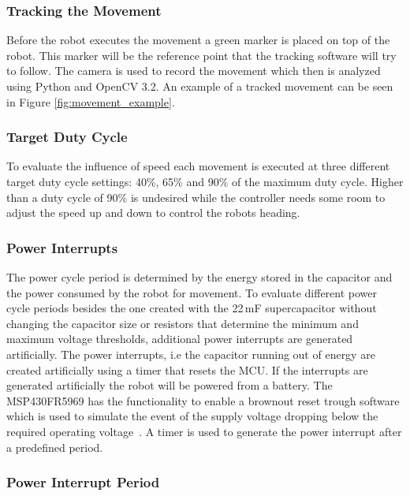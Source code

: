 \subsubsection{Tracking the Movement}

Before the robot executes the movement a green marker is placed on top of the robot.
This marker will be the reference point that the tracking software will try to follow.
The camera is used to record the movement which then is analyzed using Python and OpenCV 3.2.
An example of a tracked movement can be seen in Figure \ref{fig:movement_example}.

\subsubsection{Target Duty Cycle}
To evaluate the influence of speed each movement is executed at three different target duty cycle settings: 40\%, 65\% and 90\% of the maximum duty cycle.
Higher than a duty cycle of 90\% is undesired while the controller needs some room to adjust the speed up and down to control the robots heading.

\subsubsection{Power Interrupts}

The power cycle period is determined by the energy stored in the capacitor and the power consumed by the robot for movement.
To evaluate different power cycle periods besides the one created with the 22\,mF supercapacitor without changing the capacitor size or resistors that determine the minimum and maximum voltage thresholds, additional power interrupts are generated artificially.
The power interrupts, i.e the capacitor running out of energy are created artificially using a timer that resets the MCU.
If the interrupts are generated artificially the robot will be powered from a battery.
The MSP430FR5969 has the functionality to enable a brownout reset trough software which is used to simulate the event of the supply voltage dropping below the required operating voltage~\cite{msp430fr_family_guide_2017}.
A timer is used to generate the power interrupt after a predefined period.

\subsubsection{Power Interrupt Period}

